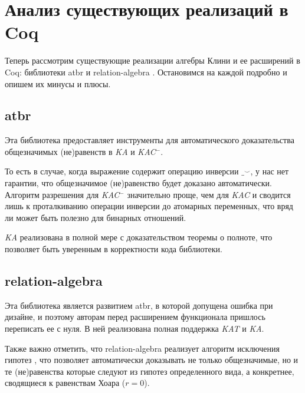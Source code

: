 \documentclass[times
              ,specification
              ,annotation
              ]{itmo-student-thesis}
\begin{document}
  \section{Анализ существующих реализаций в Coq}\label{section:coq_impls}

    Теперь рассмотрим существующие реализации алгебры Клини и ее расширений в Coq: библиотеки
    atbr \cite{atbr} и relation-algebra \cite{kat}.
    Остановимся на каждой подробно и опишем их минусы и плюсы.

    \subsection{atbr}

      Эта библиотека предоставляет инструменты для автоматического доказательства общезначимых
      (не)равенств в \textit{KA} и \textit{KAC}$^-$.

      То есть в случае, когда выражение содержит операцию инверсии $\_^\smile$, у нас нет гарантии, что
      общезначимое (не)равенство будет доказано автоматически. Алгоритм разрешения для \textit{KAC}$^-$
      значительно проще, чем для \textit{KAC} и сводится лишь к проталкиванию операции инверсии до
      атомарных переменных, что вряд ли может быть полезно для бинарных отношений.
      
      \textit{KA} реализована в полной мере с доказательством теоремы о полноте, что позволяет быть
      уверенным в корректности кода библиотеки.

    \subsection{relation-algebra}

      Эта библиотека является развитием atbr, в которой допущена ошибка при дизайне, и поэтому
      авторам перед расширением функционала пришлось переписать ее с нуля. В ней реализована полная
      поддержка \textit{KAT} и \textit{KA}.

      Также важно отметить, что relation-algebra реализует алгоритм исключения гипотез
      \cite{hkat, hkat_cpc}, что позволяет автоматически доказывать
      не только общезначимые, но и те (не)равенства которые следуют из гипотез определенного вида, а
      конкретнее, сводящиеся к равенствам Хоара ($ r = 0 $).
\end{document}
